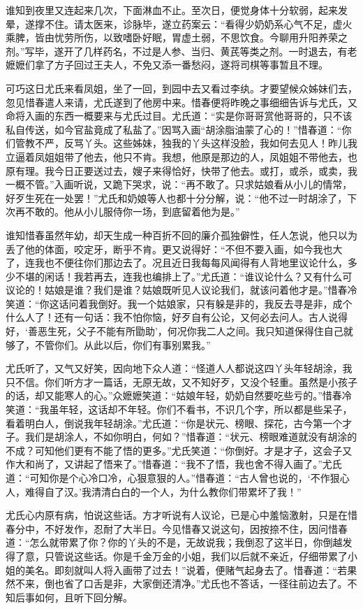\documentclass[12pt,oneside]{book}
\begin{document}
谁知到夜里又连起来几次，下面淋血不止。至次日，便觉身体十分软弱，起来发晕，遂撑不住。请太医来，诊脉毕，遂立药案云：“看得少奶奶系心气不足，虚火乘脾，皆由忧劳所伤，以致嗜卧好眠，胃虚土弱，不思饮食。今聊用升阳养荣之剂。”写毕，遂开了几样药名，不过是人参、当归、黄芪等类之剂。一时退去，有老嬷嬷们拿了方子回过王夫人，不免又添一番愁闷，遂将司棋等事暂且不理。

可巧这日尤氏来看凤姐，坐了一回，到园中去又看过李纨。才要望候众姊妹们去，忽见惜春遣人来请，尤氏遂到了他房中来。惜春便将昨晚之事细细告诉与尤氏，又命将入画的东西一概要来与尤氏过目。尤氏道：“实是你哥哥赏他哥哥的，只不该私自传送，如今官盐竟成了私盐了。”因骂入画“胡涂脂油蒙了心的！”惜春道：“你们管教不严，反骂丫头。这些姊妹，独我的丫头这样没脸，我如何去见人！昨儿我立逼着凤姐姐带了他去，他只不肯。我想，他原是那边的人，凤姐姐不带他去，也原有理。我今日正要送过去，嫂子来得恰好，快带了他去。或打，或杀，或卖，我一概不管。”入画听说，又跪下哭求，说：“再不敢了。只求姑娘看从小儿的情常，好歹生死在一处罢！”尤氏和奶娘等人也都十分分解，说：“他不过一时胡涂了，下次再不敢的。他从小儿服侍你一场，到底留着他为是。”

谁知惜春虽然年幼，却天生成一种百折不回的廉介孤独僻性，任人怎说，他只以为丢了他的体面，咬定牙，断乎不肯。更又说得好：“不但不要入画，如今我也大了，连我也不便往你们那边去了。况且近日我每每风闻得有人背地里议论什么，多少不堪的闲话！我若再去，连我也编排上了。”尤氏道：“谁议论什么？又有什么可议论的！姑娘是谁？我们是谁？姑娘既听见人议论我们，就该问着他才是。”惜春冷笑道：“你这话问着我倒好。我一个姑娘家，只有躲是非的，我反去寻是非，成个什么人了！还有一句话：我不怕你恼，好歹自有公论，又何必去问人。古人说得好，‘善恶生死，父子不能有所勖助’，何况你我二人之间。我只知道保得住自己就够了，不管你们。从此以后，你们有事别累我。”

尤氏听了，又气又好笑，因向地下众人道：“怪道人人都说这四丫头年轻胡涂，我只不信。你们听方才一篇话，无原无故，又不知好歹，又没个轻重。虽然是小孩子的话，却又能寒人的心。”众嬷嬷笑道：“姑娘年轻，奶奶自然要吃些亏的。”惜春冷笑道：“我虽年轻，这话却不年轻。你们不看书，不识几个字，所以都是些呆子，看着明白人，倒说我年轻胡涂。”尤氏道：“你是状元、榜眼、探花，古今第一个才子。我们是胡涂人，不如你明白，何如？”惜春道：“状元、榜眼难道就没有胡涂的不成？可知他们更有不能了悟的更多。”尤氏笑道：“你倒好。才是才子，这会子又作大和尚了，又讲起了悟来了。”惜春道：“我不了悟，我也舍不得入画了。”尤氏道：“可知你是个心冷口冷，心狠意狠的人。”惜春道：“古人曾也说的，‘不作狠心人，难得自了汉。’我清清白白的一个人，为什么教你们带累坏了我！”

尤氏心内原有病，怕说这些话。方才听说有人议论，已是心中羞恼激射，只是在惜春分中，不好发作，忍耐了大半日。今见惜春又说这句，因按捺不住，因问惜春道：“怎么就带累了你？你的丫头的不是，无故说我；我倒忍了这半日，你倒越发得了意，只管说这些话。你是千金万金的小姐，我们以后就不亲近，仔细带累了小姐的美名。即刻就叫人将入画带了过去！”说着，便赌气起身去了。惜春道：“若果然不来，倒也省了口舌是非，大家倒还清净。”尤氏也不答话，一径往前边去了。不知后事如何，且听下回分解。
\end{document}
